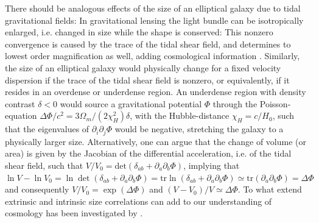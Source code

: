 \documentclass[a4paper,fleqn,usenatbib]{mnras}
\begin{document}
There should be analogous effects of the size of an elliptical galaxy due to tidal gravitational fields: In gravitational lensing the light bundle can be isotropically enlarged, i.e. changed in size while the shape is conserved: This nonzero convergence is caused by the trace of the tidal shear field, and determines to lowest order magnification as well, adding cosmological information \citep{huff_magnificent_2011, takahashi_probability_2011}. Similarly, the size of an elliptical galaxy would physically change for a fixed velocity dispersion if the trace of the tidal shear field is nonzero, or equivalently, if it resides in an overdense or underdense region. An underdense region with density contrast $\delta < 0$ would source a gravitational potential $\Phi$ through the Poisson-equation $\Delta\Phi/c^2 = 3\Omega_m/(2\chi_H^2)\delta$, with the Hubble-distance $\chi_H = c/H_0$, such that the eigenvalues of $\partial_i\partial_j\Phi$ would be negative, stretching the galaxy to a physically larger size. Alternatively, one can argue that the change of volume (or area) is given by the Jacobian of the differential acceleration, i.e. of the tidal shear field, such that $V/V_0 = \mathrm{det}(\delta_{ab} + \partial_a\partial_b\Phi)$, implying that $\ln V-\ln V_0 = \ln\det(\delta_{ab} + \partial_a\partial_b\Phi) = \mathrm{tr}\ln(\delta_{ab} + \partial_a\partial_b\Phi) \simeq \mathrm{tr}(\partial_a\partial_b\Phi) = \Delta\Phi$ and consequently $V/V_0 = \exp(\Delta\Phi)$ and $(V-V_0)/V \simeq\Delta\Phi$. To what extend extrinsic and intrinsic size correlations can add to our understanding of cosmology has been investigated by \citet{heavens_combining_2013}.
\end{document}
